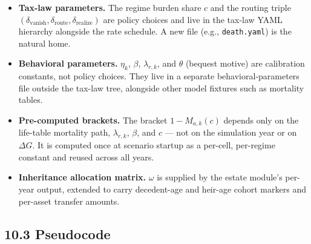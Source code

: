 \documentclass[11pt]{article}
\begin{document}
\begin{itemize}
  \item \textbf{Tax-law parameters.} The regime burden share $c$ and the routing
    triple $(\delta_{\text{vanish}}, \delta_{\text{route}}, \delta_{\text{realize}})$
    are policy choices and live in the tax-law YAML hierarchy alongside the
    rate schedule. A new file (e.g., \texttt{death.yaml}) is the natural home.
\end{itemize}
\begin{itemize}
  \item \textbf{Behavioral parameters.} $\eta_k$, $\beta$, $\lambda_{r,k}$, and
    $\theta$ (bequest motive) are calibration constants, not policy
    choices. They live in a separate behavioral-parameters file outside
    the tax-law tree, alongside other model fixtures such as mortality
    tables.
\end{itemize}
\begin{itemize}
  \item \textbf{Pre-computed brackets.} The bracket $1 - M_{a,k}(c)$ depends only on
    the life-table mortality path, $\lambda_{r,k}$, $\beta$, and $c$ — not
    on the simulation year or on $\Delta G$. It is computed once at
    scenario startup as a per-cell, per-regime constant and reused across
    all years.
\end{itemize}
\begin{itemize}
  \item \textbf{Inheritance allocation matrix.} $\omega$ is supplied by the estate
    module's per-year output, extended to carry decedent-age and heir-age
    cohort markers and per-asset transfer amounts.
\end{itemize}

\subsection*{10.3 Pseudocode}
\end{document}
